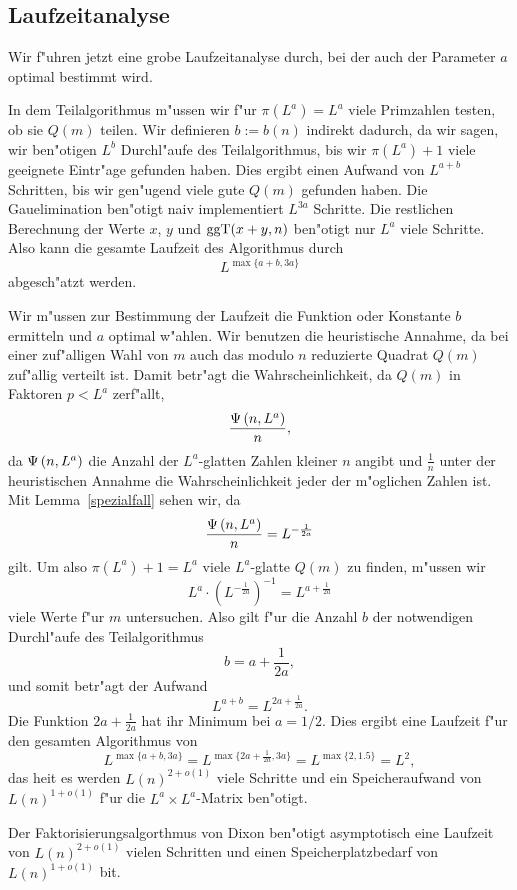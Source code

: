 
\subsection{Laufzeitanalyse}

Wir f"uhren jetzt eine grobe Laufzeitanalyse durch, bei der auch der
Parameter $a$ optimal bestimmt wird.

In dem Teilalgorithmus m"ussen wir f"ur $\pi(L^a)=L^a$ viele
Primzahlen testen, ob sie $Q(m)$ teilen. Wir definieren $b:=b(n)$
indirekt dadurch, da\3 wir sagen, wir ben"otigen $L^b$ Durchl"aufe des
Teilalgorithmus, bis wir $\pi(L^a)+1$ viele geeignete Eintr"age
gefunden haben.  Dies ergibt einen Aufwand von $L^{a+b}$ Schritten,
bis wir gen"ugend viele gute $Q(m)$ gefunden haben.  Die
Gau\3elimination ben"otigt naiv implementiert $L^{3a}$ Schritte. Die
restlichen Berechnung der Werte $x$, $y$ und $\mbox{ggT}(x+y,n)$ ben"otigt
nur $L^a$ viele Schritte.  Also kann die gesamte Laufzeit des
Algorithmus durch
$$ L^{\max\{ a+b,3a\}} $$
abgesch"atzt werden.

Wir m"ussen zur Bestimmung der Laufzeit die Funktion oder Konstante
$b$ ermitteln und $a$ optimal w"ahlen. Wir benutzen die heuristische
Annahme, da\3 bei einer zuf"alligen Wahl von $m$ auch das modulo $n$
reduzierte Quadrat $Q(m)$ zuf"allig verteilt ist. Damit betr"agt die
Wahrscheinlichkeit, da\3 $Q(m)$ in Faktoren $p < L^a$ zerf"allt,
$$ \frac{\Psi\left( n,L^a \right)}{n}, $$
da $\Psi\left( n,L^a \right)$ die Anzahl der $L^a$-glatten Zahlen kleiner $n$
angibt und $\frac{1}{n}$ unter der heuristischen Annahme die
Wahrscheinlichkeit jeder der m"oglichen Zahlen ist. Mit
Lemma~\ref{spezialfall} sehen wir, da\3
$$ \frac{\Psi\left( n,L^a \right)}{n} = L^{-\frac{1}{2a}} $$
gilt. Um also $\pi(L^a) + 1 = L^a$ viele $L^a$-glatte $Q(m)$ 
zu finden, m"ussen wir
$$ L^a \cdot \left( L^{-\frac{1}{2a}} \right)^{-1} = L^{a+\frac{1}{2a}} $$
viele Werte f"ur $m$ untersuchen. Also gilt f"ur die Anzahl $b$ der
notwendigen Durchl"aufe des Teilalgorithmus
$$ b = a + \frac{1}{2a} , $$
und somit betr"agt der Aufwand
$$ L^{a+b} = L^{2a+\frac{1}{2a}}. $$
Die Funktion $2a + \frac{1}{2a}$ hat ihr Minimum bei $a=1/2$. Dies
ergibt eine Laufzeit f"ur den gesamten Algorithmus von
$$ L^{\max\{ a+b, 3a \}} = L^{\max\{ 2a + \frac{1}{2a}, 3a\}} = 
   L^{\max\{ 2, 1.5\}} = L^2, $$
das hei\3t es werden $L(n)^{2+o(1)}$ viele Schritte und ein
Speicheraufwand von $L(n)^{1+o(1)}$ f"ur die $L^a \times L^a$-Matrix
ben"otigt.

\begin{satz}
  Der Faktorisierungsalgorthmus von Dixon ben"otigt asymptotisch eine
  Laufzeit von $L(n)^{2+o(1)}$ vielen Schritten und einen
  Speicherplatzbedarf von $L(n)^{1+o(1)}$ bit.
\end{satz}

